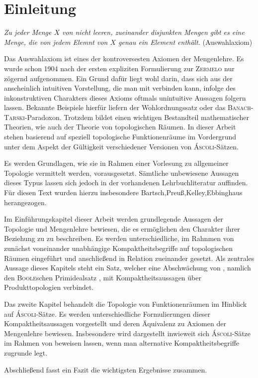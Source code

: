 \chapter*{Einleitung}

\begin{addmargin}[2em]{2em}%
  \textit{Zu jeder Menge $X$ von nicht leeren, zueinander disjunkten Mengen gibt es eine Menge, die von jedem Elemnt von $X$ genau ein Element enthält.} 
  \flushright(Auswahlaxiom)
\end{addmargin}

Das Auswahlaxiom \AC ist eines der kontroversesten Axiomen der Mengenlehre.
Es wurde schon 1904 nach der ersten expliziten Formulierung zur \textsc{Zermelo} nur zögernd aufgenommen. 
Ein Grund dafür liegt wohl darin, dass sich aus der anscheinlich intuitiven Vorstellung, die man mit \AC verbinden kann, infolge des inkonstruktiven Charakters dieses Axioms oftmals unintuitive Aussagen folgern lassen.
Bekannte Beispiele hierfür liefern der Wohlordnungssatz oder das \textsc{Banach}-\textsc{Tarski}-Paradoxon.
Trotzdem bildet \AC einen wichtigen Bestandteil mathematischer Theorien, wie auch der Theorie von topologischen Räumen.
In dieser Arbeit stehen basierend auf \cite{herrlich2006axiom} speziell topologische Funktionenräume im Vordergrund unter dem Aspekt der Gültigkeit verschiedener Versionen von \textsc{Áscoli}-Sätzen.

Es werden Grundlagen, wie sie in Rahmen einer Vorlesung zu allgemeiner Topologie vermittelt werden, vorausgesetzt.
Sämtliche unbewiesene Aussagen dieses Typus lassen sich jedoch in der vorhandenen Lehrbuchliteratur auffinden.
Für diesen Text wurden hierzu insbesondere Bartsch,Preuß,Kelley,Ebbinghaus herangezogen.

Im Einführungskapitel dieser Arbeit werden grundlegende Aussagen der Topologie und Mengenlehre bewiesen, die es ermöglichen den Charakter ihrer Beziehung zu \AC zu beschreiben. 
Es werden unterschiedliche, im Rahnmen von \ZF zunächst voneinander unabhängige Kompaktheitsbegriffe auf topologischen Räumen eingeführt und anschließend in Relation zueinander gesetzt.
Als zentrales Aussage dieses Kapitels steht ein Satz, welcher eine Abschwächung von \AC, namlich den \textsc{Boole}schen Primidealsatz \PIT, mit Kompaktheitsaussagen über Produkttopologien verbindet.

Das zweite Kapitel behandelt die Topologie von Funktionenräumen im Hinblick auf \textsc{Áscoli}-Sätze.
Es werden unterschiedliche Formulierungen dieser Kompaktheitsaussagen vorgestellt und deren Äquivalenz zu Axiomen der Mengenlehre bewiesen.
Insbesondere wird dargestellt inwieweit sich \textsc{Áscoli}-Sätze im Rahmen von \ZF beweisen lassen, wenn man alternative Kompaktheitsbegriffe zugrunde legt.

Abschließend fasst ein Fazit die wichtigsten Ergebnisse zusammen.
